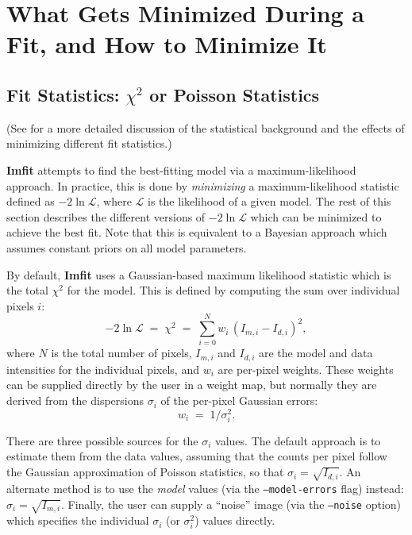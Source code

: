 \documentclass[10pt,a4paper,article]{memoir}
\newcommand{\Imfit}{\textbf{Imfit}}
\newcommand{\chisquare}{\ensuremath{\chi^{2}}}
\begin{document}
\newpage

\chapter{What Gets Minimized During a Fit, and How to Minimize It}

\section{Fit Statistics: \chisquare{} or Poisson Statistics}\label{sec:fit-statistics}

(See \cite{erwin15} for a more detailed discussion of the statistical
background and the effects of minimizing different fit statistics.)

\Imfit{} attempts to find the best-fitting model via a
maximum-likelihood approach. In practice, this is done by
\textit{minimizing} a maximum-likelihood statistic defined as $-2 \ln
\mathcal{L}$, where $\mathcal{L}$ is the likelihood of a given model. The rest
of this section describes the different versions of $-2 \ln \mathcal{L}$
which can be minimized to achieve the best fit. Note that this is equivalent
to a Bayesian approach which assumes constant priors on all model parameters.

By default, \Imfit{} uses a Gaussian-based maximum likelihood statistic
which is the total \chisquare{} for the model. This is defined by
computing the sum over individual pixels $i$:
\begin{equation}
-2 \ln \mathcal{L}  \; = \; \chisquare \; = \; \sum_{i = 0}^{N} w_{i} \, (I_{m, i} - I_{d, i})^2 ,
\end{equation}
where $N$ is the total number of pixels, $I_{m, i}$ and $I_{d, i}$ are the model and data intensities
for the individual pixels, and $w_{i}$ are per-pixel weights. These weights can be
supplied directly by the user in a weight map, but normally they are derived from the
dispersions $\sigma_{i}$ of the per-pixel Gaussian errors:
\begin{equation}
w_{i} \; = \; 1/\sigma_{i}^{2} .
\end{equation}

There are three possible sources for the $\sigma_{i}$ values. The
default approach is to estimate them from the data values, assuming that
the counts per pixel follow the Gaussian approximation of Poisson
statistics, so that $\sigma_{i} = \sqrt{I_{d,i}}$. An alternate method
is to use the \textit{model} values (via the \texttt{--model-errors}
flag) instead: $\sigma_{i} = \sqrt{I_{m,i}}$. Finally, the user can
supply a ``noise'' image (via the \texttt{--noise} option) which
specifies the individual $\sigma_{i}$ (or $\sigma_{i}^{2}$) values
directly.
\end{document}
